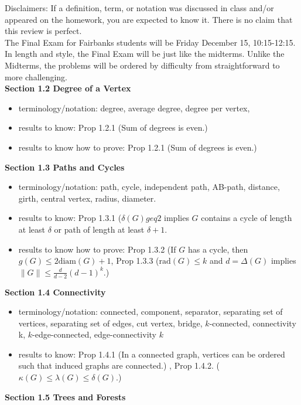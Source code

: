 \documentclass[12pt]{article}
\begin{document}
Disclaimers: If a definition, term, or notation was discussed in class and/or appeared on the homework, you are expected to know it. There is no claim that this review is perfect.\\

The Final Exam for Fairbanks students will be Friday December 15, 10:15-12:15.\\

In length and style, the Final Exam will be just like the midterms. Unlike the Midterms, the problems will be ordered by difficulty from straightforward to more challenging. \\

\noindent \textbf{Section 1.2 Degree of a Vertex}
	\begin{itemize}
	\item terminology/notation: degree, average degree, degree per vertex, 
	\item results to know: Prop 1.2.1 (Sum of degrees is even.) 
	\item results to know how to prove: Prop 1.2.1 (Sum of degrees is even.) 
	\end{itemize}
\noindent \textbf{Section 1.3 Paths and Cycles}
	\begin{itemize}
	\item terminology/notation: path, cycle, independent path, AB-path, distance, girth, central vertex, radius, diameter.
	\item results to know: Prop 1.3.1 ($\delta(G) geq 2$ implies $G$ contains a cycle of length at least $\delta$ or path of length at least $\delta +1.$
	\item results to know how to prove: Prop 1.3.2 (If $G$ has a cycle, then $g(G) \leq 2\text{diam}(G)+1$, Prop 1.3.3 ($\text{rad}(G) \leq k$ and $d=\Delta(G)$ implies $\parallel G \parallel \leq \frac{d}{d-2}(d-1)^k.$)
	\end{itemize}
\noindent \textbf{Section 1.4 Connectivity}
	\begin{itemize}
	\item terminology/notation: connected, component, separator, separating set of vertices, separating set of edges, cut vertex, bridge, $k$-connected, connectivity k, $k$-edge-connected, edge-connectivity $k$
	\item results to know: Prop 1.4.1 (In a connected graph, vertices can be ordered such that induced graphs are connected.) , Prop 1.4.2. ($\kappa(G) \leq \lambda(G) \leq \delta(G).$)
	\end{itemize}
\noindent \textbf{Section 1.5 Trees and Forests}
\end{document}
